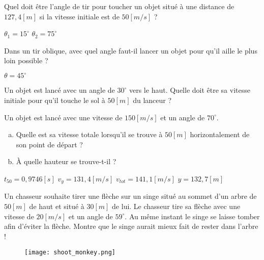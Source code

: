 \begin{exercise}
    Quel doit être l'angle de tir pour toucher un objet situé à une distance de \(127,4[m]\) si la vitesse initiale est de \(50[m/s]\) ?
\end{exercise}
\begin{solution}
    \(\theta_1=15^{\circ}\)
    \(\theta_2=75^{\circ}\)
\end{solution}


\begin{exercise}
    Dans un tir oblique, avec quel angle faut-il lancer un objet pour qu'il aille le plus loin possible ?
\end{exercise}
\begin{solution}
    \(\theta=45^{\circ}\)
\end{solution}


\begin{exercise}
    Un objet est lancé avec un angle de \(30^{\circ}\) vers le haut. Quelle doit être sa vitesse initiale pour qu'il touche le sol à \(50[m]\) du lanceur ?
\end{exercise}


\begin{exercise}
    Un objet est lancé avec une vitesse de \(150[m/s]\) et un angle de \(70^{\circ}\).
    \begin{enumerate}[a)]
        \item Quelle est sa vitesse totale lorsqu'il se trouve à \(50[m]\) horizontalement de son point de départ ?
        \item À quelle hauteur se trouve-t-il ?
    \end{enumerate}
\end{exercise}
\begin{solution}
    \(t_{50}=0,9746[s]\)
    \(v_y=131,4[m/s]\)
    \(v_{tot}=141,1[m/s]\)
    \(y=132,7[m]\)
\end{solution}


\begin{exercise}
    Un chasseur souhaite tirer une flèche sur un singe situé au sommet d'un arbre de \(50[m]\) de haut et situé à \(30[m]\) de lui. Le chasseur tire sa flèche avec une vitesse de \(20[m/s]\) et un angle de \(59^{\circ}\). Au même instant le singe se laisse tomber afin d'éviter la flèche. Montre que le singe aurait mieux fait de rester dans l'arbre !
    \begin{figure}[h!]
        \centering
        \texttt{[image: shoot\_monkey.png]}
    \end{figure}
\end{exercise}


